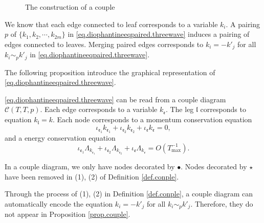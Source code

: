 \begin{defn}
\begin{enumerate}
\begin{figure}[H]
{
    }
        \caption{The construction of a couple}
        \label{fig.couple}
    \end{figure}
    
    We know that each edge connected to leaf corresponds to a variable $k_i$. A pairing $p$ of $\{k_1,k_2,\cdots,k_{2m}\}$ in \eqref{eq.diophantineeqpaired.threewave} induces a pairing of edges connected to leaves. Merging paired edges corresponds to $k_{i}=-k'_{j}$ for all $k_{i}\sim_{p}k'_{j}$ in \eqref{eq.diophantineeqpaired.threewave}. 
\end{enumerate}
\end{defn}

The following proposition introduce the graphical representation of \eqref{eq.diophantineeqpaired.threewave}.

\begin{prop}\label{prop.couple}
\eqref{eq.diophantineeqpaired.threewave} can be read from a couple diagram $\mathcal{C}(T,T,p)$. Each edge corresponds to a variable $k_{\mathfrak{e}}$. The leg $\mathfrak{l}$ corresponds to equation $k_{\mathfrak{l}}=k$. Each node corresponds to a momentum conservation equation
\begin{equation}
    \iota_{\mathfrak{e}_1}k_{\mathfrak{e}_1}+\iota_{\mathfrak{e}_2}k_{\mathfrak{e}_2}+\iota_{\mathfrak{e}}k_{\mathfrak{e}}=0,
\end{equation} 
and a energy conservation equation \begin{equation}
    \iota_{\mathfrak{e}_1}\Lambda_{k_{\mathfrak{e}_1}}+\iota_{\mathfrak{e}_2}\Lambda_{k_{\mathfrak{e}_2}}+\iota_{\mathfrak{e}}\Lambda_{k_{\mathfrak{e}}} = O(T^{-1}_{\text{max}}).
\end{equation}  
\end{prop}
\begin{rem}
In a couple diagram, we only have nodes decorated by $\bullet$. Nodes decorated by $\star$ have been removed in (1), (2) of Definition \ref{def.conple}.
\end{rem}
\begin{rem}
Through the process of (1), (2) in Definition \ref{def.conple}, a couple diagram can automatically encode the equation $k_{i}=-k'_{j}$ for all $k_{i}\sim_{p}k'_{j}$. Therefore, they do not appear in Proposition \ref{prop.couple}.
\end{rem}

